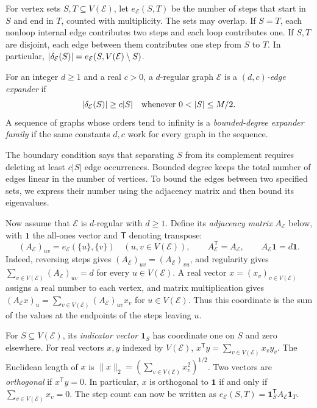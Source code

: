For vertex sets $S,T\subseteq V(\mathcal E)$, let
$e_{\mathcal E}(S,T)$ be the number of steps that start in $S$ and
end in $T$, counted with multiplicity. The sets may overlap. If
$S=T$, each nonloop internal edge contributes two steps and each loop
contributes one. If $S,T$ are disjoint, each edge between them
contributes one step from $S$ to $T$.
In particular,
$|\delta_{\mathcal E}(S)|=e_{\mathcal E}(S,V(\mathcal E)\setminus S)$.

\begin{definition}
For an integer $d\ge1$ and a real $c>0$, a $d$-regular graph $\mathcal E$ is a
\emph{$(d,c)$-edge expander} if
\[
 |\cut_{\mathcal E}(S)|\ge c|S|
 \quad\text{whenever }0<|S|\le M/2.
\]
A sequence of graphs whose orders tend to infinity is a
\emph{bounded-degree expander family} if the same constants $d,c$
work for every graph in the sequence.
\end{definition}

The boundary condition says that separating $S$ from its complement
requires deleting at least $c|S|$ edge occurrences. Bounded degree
keeps the total number of edges linear in the number of vertices.
To bound the edges between two specified sets, we express their
number using the adjacency matrix and then bound its eigenvalues.

Now assume that $\mathcal E$ is $d$-regular with $d\ge1$. Define its \emph{adjacency
matrix} $A_{\mathcal E}$ below, with $\mathbf1$ the all-ones vector
and $\mathsf T$ denoting transpose:
\begin{equation}\label{eq:auxiliary-regular-adjacency}
 (A_{\mathcal E})_{uv}=e_{\mathcal E}(\{u\},\{v\})
 \quad(u,v\in V(\mathcal E)),\qquad
 A_{\mathcal E}^{\mathsf T}=A_{\mathcal E},\qquad
 A_{\mathcal E}\mathbf1=d\mathbf1.
\end{equation}
Indeed, reversing steps gives
$(A_{\mathcal E})_{uv}=(A_{\mathcal E})_{vu}$, and regularity gives
$\sum_{v\in V(\mathcal E)}(A_{\mathcal E})_{uv}=d$
for every $u\in V(\mathcal E)$.
A real vector $x=(x_v)_{v\in V(\mathcal E)}$ assigns a real number to
each vertex, and matrix multiplication gives
$(A_{\mathcal E}x)_u=\sum_{v\in V(\mathcal E)}(A_{\mathcal E})_{uv}x_v$
for $u\in V(\mathcal E)$.
Thus this coordinate is the sum of the values at the endpoints of
the steps leaving $u$.

For $S\subseteq V(\mathcal E)$, its
\emph{indicator vector} $\mathbf1_S$ has coordinate one on $S$ and
zero elsewhere. For real vectors $x,y$ indexed by $V(\mathcal E)$,
$x^{\mathsf T}y=\sum_{v\in V(\mathcal E)}x_vy_v$. The Euclidean length of $x$ is
$\|x\|_2=(\sum_{v\in V(\mathcal E)}x_v^2)^{1/2}$. Two vectors are
\emph{orthogonal} if $x^{\mathsf T}y=0$. In particular,
$x$ is orthogonal to $\mathbf1$ if and only if
$\sum_{v\in V(\mathcal E)}x_v=0$.
The step count can now be written as
$e_{\mathcal E}(S,T)=\mathbf1_S^{\mathsf T}A_{\mathcal E}\mathbf1_T$.

